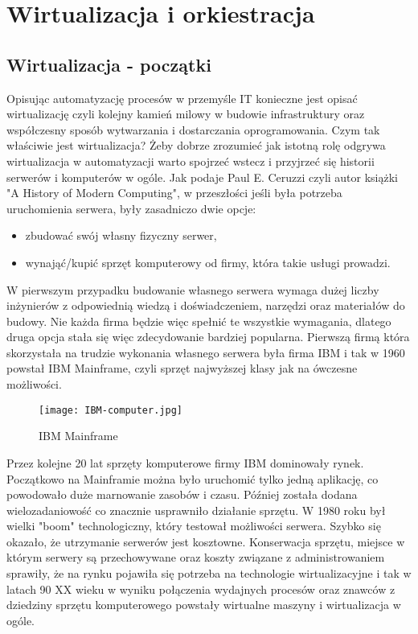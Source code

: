 \section{Wirtualizacja i orkiestracja}

\subsection{Wirtualizacja - początki}
Opisując automatyzację procesów w przemyśle IT konieczne jest opisać wirtualizację czyli kolejny kamień milowy w budowie infrastruktury oraz współczesny sposób wytwarzania i dostarczania oprogramowania. Czym tak właściwie jest wirtualizacja? 
Żeby dobrze zrozumieć jak istotną rolę odgrywa wirtualizacja w automatyzacji warto spojrzeć wstecz i przyjrzeć się historii serwerów i komputerów w ogóle.   Jak podaje Paul E. Ceruzzi czyli autor książki "A History of Modern Computing", w przeszłości jeśli była potrzeba uruchomienia serwera, były zasadniczo dwie opcje: 
\begin{itemize}
    \item zbudować swój własny fizyczny serwer,
    \item wynająć/kupić sprzęt komputerowy od firmy, która takie usługi prowadzi.
\end{itemize}
W pierwszym przypadku budowanie własnego serwera wymaga dużej liczby inżynierów z odpowiednią wiedzą i doświadczeniem, narzędzi oraz materiałów do budowy. Nie każda firma będzie więc spełnić te wszystkie wymagania, dlatego druga opcja stała się więc zdecydowanie bardziej popularna. Pierwszą firmą która skorzystała na trudzie wykonania własnego serwera była firma IBM i tak w 1960 powstał IBM Mainframe, czyli sprzęt najwyższej klasy jak na  ówczesne możliwości.

\begin{figure}[htbp]
    \centering
    \texttt{[image: IBM-computer.jpg]}
    \caption{IBM Mainframe}
    \label{fig:ibm-mainframe}
\end{figure}

Przez kolejne 20 lat sprzęty komputerowe firmy IBM dominowały rynek. Początkowo na Mainframie można było uruchomić tylko jedną aplikację, co powodowało duże marnowanie zasobów i czasu. Później została dodana wielozadaniowość co znacznie usprawniło działanie sprzętu. W 1980 roku był wielki "boom" technologiczny, który testował możliwości serwera. Szybko się okazało, że utrzymanie serwerów jest kosztowne. Konserwacja sprzętu, miejsce w którym serwery są przechowywane oraz koszty związane z administrowaniem sprawiły, że na rynku pojawiła się potrzeba na technologie wirtualizacyjne i tak w latach 90 XX wieku w wyniku połączenia wydajnych procesów oraz znawców z dziedziny sprzętu komputerowego powstały wirtualne maszyny i wirtualizacja w ogóle. 

